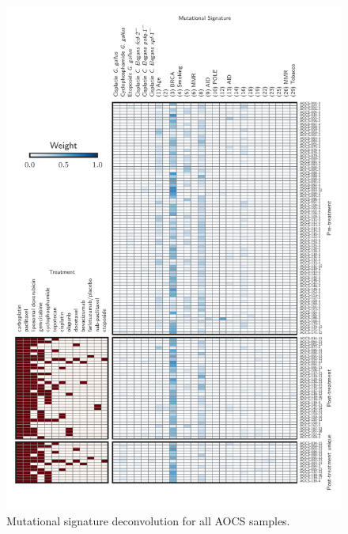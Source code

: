 \begin{figure}
\centering
\includegraphics[scale=1.0]{figures/supplementary_signatures.pdf}
\caption{Mutational signature deconvolution for all AOCS samples. }
\label{sfig:supp_signatures}
\end{figure}

